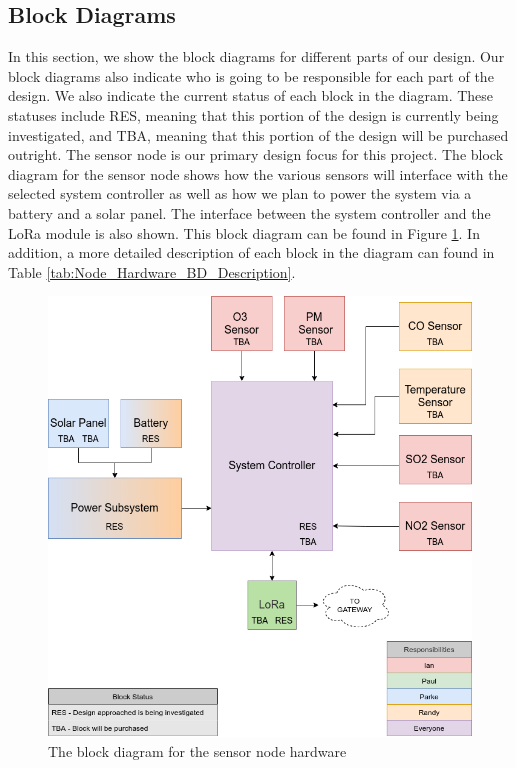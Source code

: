 \subsection{Block Diagrams}
In this section, we show the block diagrams for different parts of our design. Our block diagrams also indicate who is going to be responsible for each part of the design. We also indicate the current status of each block in the diagram. These statuses include RES, meaning that this portion of the design is currently being investigated, and TBA, meaning that this portion of the design will be purchased outright. The sensor node is our primary design focus for this project. The block diagram for the sensor node shows how the various sensors will interface with the selected system controller as well as how we plan to power the system via a battery and a solar panel. The interface between the system controller and the LoRa module is also shown. This block diagram can be found in Figure \ref{fig:hwNodeBD}. In addition, a more detailed description of each block in the diagram can found in Table \ref{tab:Node_Hardware_BD_Description}.

\begin{figure}[H]
    \centering
    \includegraphics[width=4.5in]{"./figures/hwNodeBD.png"} 
    \caption{The block diagram for the sensor node hardware}
    \label{fig:hwNodeBD}
\end{figure}

